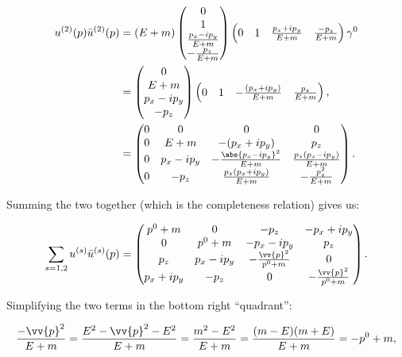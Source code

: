 \begin{align*}
    u^{(2)}(p)\bar{u}^{(2)}(p) &= (E+m)\begin{pmatrix}0 \\ 1 \\ \frac{p_x-ip_y}{E+m} \\ -\frac{p_z}{E+m}\end{pmatrix}\begin{pmatrix}0 & 1 & \frac{p_x+ip_y}{E+m} & \frac{-p_z}{E+m}\end{pmatrix}\gamma^0 \\
    &= \begin{pmatrix}0 \\ E+m \\ p_x-ip_y \\ -p_z\end{pmatrix}\begin{pmatrix}0 & 1 & -\frac{(p_x+ip_y)}{E+m} & \frac{p_z}{E+m}\end{pmatrix}, \\
    &= \begin{pmatrix}0 & 0 & 0 & 0 \\ 0 & E+m & -(p_x+ip_y) & p_z \\ 0 & p_x-ip_y & -\frac{\abs{p_x-ip_y}^2}{E+m} & \frac{p_z(p_x-ip_y)}{E+m} \\ 0 & -p_z & \frac{p_z(p_x+ip_y)}{E+m} & -\frac{p_z^2}{E+m}\end{pmatrix}.
\end{align*}

Summing the two together (which is the completeness relation) gives us:

\begin{equation*}
    \sum_{s=1,2}u^{(s)}\bar{u}^{(s)}(p) = \begin{pmatrix}p^0+m & 0 & -p_z & -p_x+ip_y \\ 0 & p^0+m & -p_x-ip_y & p_z \\ p_z & p_x-ip_y & -\frac{\vv{p}^2}{p^0+m} & 0 \\ p_x+ip_y & -p_z & 0 & -\frac{\vv{p}^2}{p^0+m} \end{pmatrix}.
\end{equation*}

Simplifying the two terms in the bottom right ``quadrant'':

\begin{equation*}
    \frac{-\vv{p}^2}{E+m} = \frac{E^2 - \vv{p}^2 - E^2}{E+m} = \frac{m^2 - E^2}{E+m} = \frac{(m-E)(m+E)}{E+m} = -p^0 + m,
\end{equation*}

